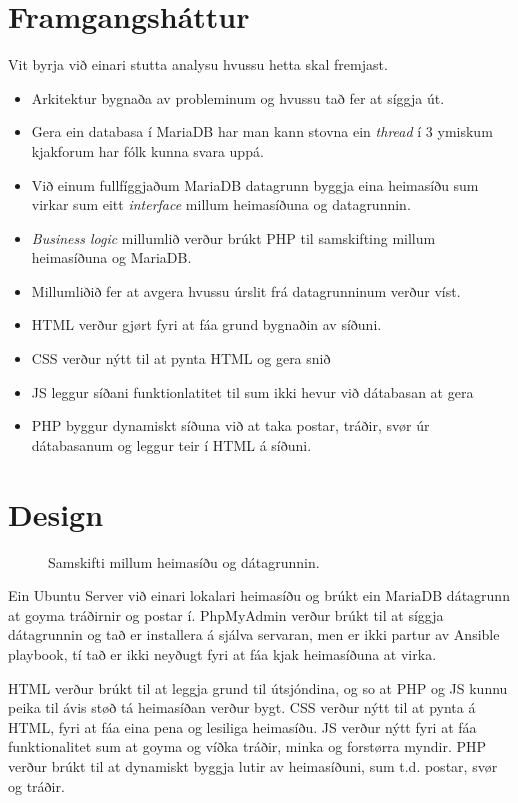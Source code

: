 \documentclass{article}
\begin{document}
\section{Framgangsháttur}
\par Vit byrja við einari stutta analysu hvussu hetta skal fremjast.
\begin{itemize}
    \item Arkitektur bygnaða av probleminum og hvussu tað fer at síggja út.
    \item Gera ein databasa í MariaDB har man kann stovna ein \textit{thread} í 3 ymiskum kjakforum har fólk kunna svara uppá.
    \item Við einum fullfíggjaðum MariaDB datagrunn byggja eina heimasíðu sum virkar sum eitt \textit{interface} millum heimasíðuna og datagrunnin.
    \item \textit{Business logic} millumlið verður brúkt PHP til samskifting millum
            \newline heimasíðuna og MariaDB.
    \item Millumliðið fer at avgera hvussu úrslit frá datagrunninum verður víst.    
\end{itemize}

\begin{itemize}
    \item HTML verður gjørt fyri at fáa grund bygnaðin av síðuni.
    \item CSS verður nýtt til at pynta HTML og gera snið
    \item JS leggur síðani funktionlatitet til sum ikki hevur við dátabasan at gera
    \item PHP byggur dynamiskt síðuna við at taka postar, tráðir, svør úr dátabasanum
og leggur teir í HTML á síðuni.
\end{itemize}


\section{Design}
\begin{figure}[H]
    \centering
     
    \caption{Samskifti millum heimasíðu og dátagrunnin.}
    \label{fig:html-cs-db.svg}
\end{figure}

\par Ein Ubuntu Server við einari lokalari heimasíðu og brúkt ein MariaDB dátagrunn
at goyma tráðirnir og postar í.
PhpMyAdmin verður brúkt til at síggja dátagrunnin og tað er installera á sjálva servaran,
men er ikki partur av Ansible playbook, tí tað er ikki neyðugt fyri at fáa kjak heimasíðuna
at virka.
\par HTML verður brúkt til at leggja grund til útsjóndina, og so at PHP og JS kunnu peika
til ávis støð tá heimasíðan verður bygt. CSS verður nýtt til at pynta á HTML, fyri at fáa eina
pena og lesiliga heimasíðu. JS verður nýtt fyri at fáa funktionalitet sum at goyma og víðka
tráðir, minka og forstørra myndir. PHP verður brúkt til at dynamiskt byggja lutir av
heimasíðuni, sum t.d. postar, svør og tráðir.
\end{document}
